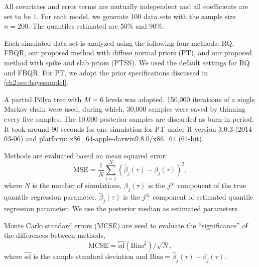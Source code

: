 \documentclass[12pt]{article}
\newcommand{\polya}{P\'{o}lya}
\begin{document}
All covariates and error terms are mutually independent and all coefficients are set to be 1.
For each model, we generate 100 data sets with the sample size $n=200$.
The quantiles estimated are 50\% and 90\%.

Each simulated data set is analyzed using the following four methods:
RQ, FBQR, our proposed method with diffuse normal priors (PT), and our proposed method with spike and slab priors (PTSS).
We used the default settings for RQ and FBQR.
For PT, we adopt the prior specifications discussed in \ref{ch2:sec:bayesmodel}.

A partial \polya{} tree with $M=6$ levels was adopted.
150,000 iterations of a single Markov chain were used,
during which, 30,000 samples were saved by thinning every five samples.
The 10,000 posterior samples are discarded as burn-in period.
It took around 90 seconds for one simulation for PT under R version 3.0.3 (2014-03-06) and platform: x86\_64-apple-darwin9.8.0/x86\_64 (64-bit).

Methods are evaluated based on mean squared error:
\begin{displaymath}
  \mbox{MSE}  =  \frac{1}{N}\sum_{i = 1}^N (\hat{\beta}_j(\tau) -
  \beta_j(\tau))^2 ,
\end{displaymath}
where $N$ is the number of simulations, $\beta_j(\tau)$ is the $j^{th}$ component of the true quantile regression parameter.
$\hat{\beta}_j(\tau)$ is the $j^{th}$ component of estimated quantile regression parameter.
We use the posterior median as estimated parameters.

Monte Carlo standard errors (MCSE) are used to evaluate the ``significance'' of the differences between methods,
\begin{displaymath}
  \mbox{MCSE} = \widehat{\mbox{sd}}(\mbox{Bias}^2)/\sqrt{N},
\end{displaymath}
where $\widehat{\mbox{sd}}$ is the sample standard deviation and $\mbox{Bias} = \hat{\beta}_{j}(\tau) - \beta_{j}(\tau)$.
\end{document}
